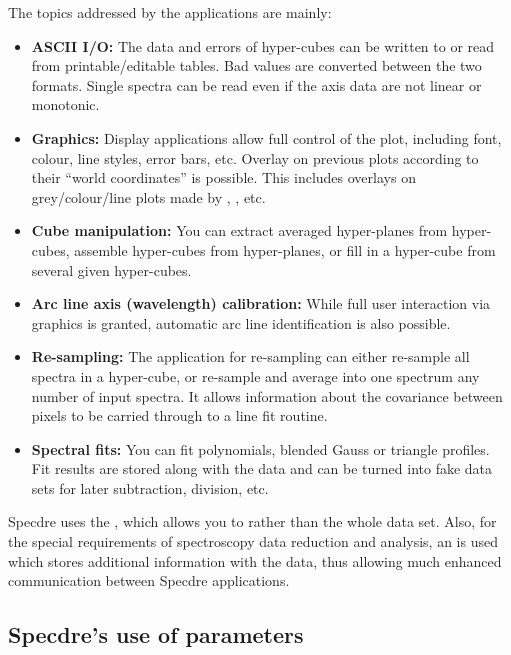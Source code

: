    The topics addressed by the applications are mainly:

\begin{itemize}
\item {\bf ASCII I/O:} The data and errors of hyper-cubes can be written
   to or read from printable/editable tables. Bad values are converted
   between the two formats. Single spectra can be read even if the axis
   data are not linear or monotonic.
\item {\bf Graphics:} Display applications allow full control of
   the plot, including font, colour, line styles, error bars, etc.
   Overlay on previous plots according to their ``world coordinates'' is
   possible. This includes overlays on grey/colour/line plots made by
   , , etc.
\item {\bf Cube manipulation:} You can extract averaged hyper-planes
   from hyper-cubes, assemble hyper-cubes from hyper-planes, or fill in
   a hyper-cube from several given hyper-cubes.
\item {\bf Arc line axis (wavelength) calibration:} While full user
   interaction via graphics is granted, automatic arc line
   identification is also possible.
\item {\bf Re-sampling:} The application for re-sampling can either
   re-sample all spectra in a hyper-cube, or re-sample and average into
   one spectrum any number of input spectra. It allows information about
   the covariance between pixels to be carried through to a line fit
   routine.
\item {\bf Spectral fits:} You can fit polynomials, blended Gauss or
   triangle profiles. Fit results are stored along with the data and can
   be turned into fake data sets for later subtraction, division, etc.
\end{itemize}

   Specdre uses the ,
   which allows you to 
   rather than the whole data set. Also, for the special requirements of
   spectroscopy data reduction and analysis, an
   is used which stores additional information with the data, thus
   allowing much enhanced communication between Specdre applications.


\subsection{\label{specdreparams}Specdre's use of parameters}

